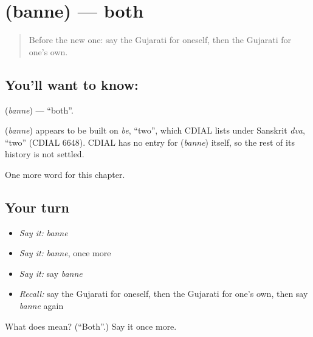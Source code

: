 \section[\texorpdfstring{\gu{બંને} (banne)}{બંને (banne)}]{ (banne) — both}

\label{lesson:GU-C100-banne}



\begin{quote}
Before the new one: say the Gujarati for oneself, then the Gujarati for one's own.
\end{quote}

\subsection*{You'll want to know: }
\textbf{} (\emph{banne}) — \textquotedblleft{}both\textquotedblright{}.

\begin{cousinweb}
\textbf{} (\emph{banne}) appears to be built on \emph{be}, \textquotedblleft{}two\textquotedblright{}, which CDIAL lists under Sanskrit \emph{dva}, \textquotedblleft{}two\textquotedblright{} (CDIAL 6648). CDIAL has no entry for \textbf{} (\emph{banne}) itself, so the rest of its history is not settled.
\end{cousinweb}

\begin{grammarlens}[title={What you've built}]
One more word for this chapter.
\end{grammarlens}

\subsection*{Your turn}
\begin{itemize}
\raggedright
  \item \emph{Say it:} \emph{banne}
  \item \emph{Say it:} \emph{banne}, once more
  \item \emph{Say it:} say \emph{banne}
  \item \emph{Recall:} say the Gujarati for oneself, then the Gujarati for one's own, then say \emph{banne} again
\end{itemize}

\begin{tcolorbox}[breakable,colback=teal!4,colframe=teal!35!black,title={Before you move on}]
What does  mean? (\textquotedblleft{}Both\textquotedblright{}.) Say it once more.
\end{tcolorbox}
